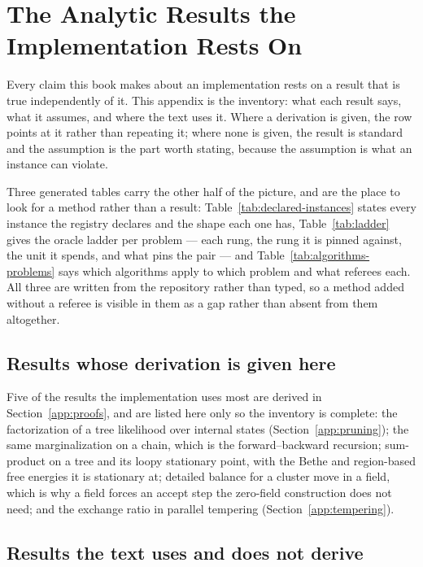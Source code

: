 \documentclass[11pt,a4paper]{article}
\begin{document}
\section{The Analytic Results the Implementation Rests On}
\label{app:analytic-results}

Every claim this book makes about an implementation rests on a result that is
true independently of it. This appendix is the inventory: what each result
says, what it assumes, and where the text uses it. Where a derivation is
given, the row points at it rather than repeating it; where none is given, the
result is standard and the assumption is the part worth stating, because the
assumption is what an instance can violate.

Three generated tables carry the other half of the picture, and are the place
to look for a method rather than a result: Table~\ref{tab:declared-instances}
states every instance the registry declares and the shape each one has,
Table~\ref{tab:ladder} gives the oracle ladder per problem --- each rung, the
rung it is pinned against, the unit it spends, and what pins the pair --- and
Table~\ref{tab:algorithms-problems} says which algorithms apply to which
problem and what referees each. All three are written from the repository
rather than typed, so a method added without a referee is visible in them as a
gap rather than absent from them altogether.

\subsection{Results whose derivation is given here}

Five of the results the implementation uses most are derived in
Section~\ref{app:proofs}, and are listed here only so the inventory is
complete: the factorization of a tree likelihood over internal states
(Section~\ref{app:pruning}); the same marginalization on a chain, which is the
forward--backward recursion; sum-product on a tree and its loopy stationary
point, with the Bethe and region-based free energies it is stationary at;
detailed balance for a cluster move in a field, which is why a field forces an
accept step the zero-field construction does not need; and the exchange ratio
in parallel tempering (Section~\ref{app:tempering}).

\subsection{Results the text uses and does not derive}
\end{document}
